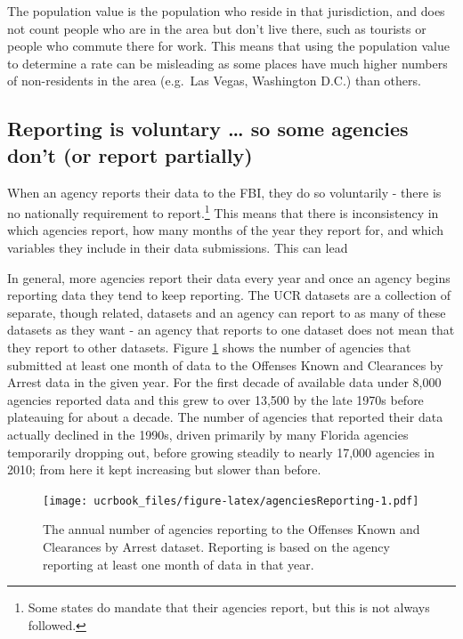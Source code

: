\documentclass[
  12pt,
  openany]{book}
\begin{document}
The population value is the population who reside in that jurisdiction, and does not count people who are in the area but don't live there, such as tourists or people who commute there for work. This means that using the population value to determine a rate can be misleading as some places have much higher numbers of non-residents in the area (e.g.~Las Vegas, Washington D.C.) than others.

\hypertarget{voluntary}{%
\subsection{Reporting is voluntary \ldots{} so some agencies don't (or report partially)}\label{voluntary}}

When an agency reports their data to the FBI, they do so voluntarily - there is no nationally requirement to report.\footnote{Some states do mandate that their agencies report, but this is not always followed.} This means that there is inconsistency in which agencies report, how many months of the year they report for, and which variables they include in their data submissions. This can lead

In general, more agencies report their data every year and once an agency begins reporting data they tend to keep reporting. The UCR datasets are a collection of separate, though related, datasets and an agency can report to as many of these datasets as they want - an agency that reports to one dataset does not mean that they report to other datasets. Figure \ref{fig:agenciesReporting} shows the number of agencies that submitted at least one month of data to the Offenses Known and Clearances by Arrest data in the given year. For the first decade of available data under 8,000 agencies reported data and this grew to over 13,500 by the late 1970s before plateauing for about a decade. The number of agencies that reported their data actually declined in the 1990s, driven primarily by many Florida agencies temporarily dropping out, before growing steadily to nearly 17,000 agencies in 2010; from here it kept increasing but slower than before.

\begin{figure}
\centering
\texttt{[image: ucrbook\_files/figure-latex/agenciesReporting-1.pdf]}
\caption{\label{fig:agenciesReporting}The annual number of agencies reporting to the Offenses Known and Clearances by Arrest dataset. Reporting is based on the agency reporting at least one month of data in that year.}
\end{figure}
\end{document}
